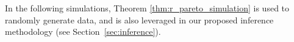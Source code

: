 \documentclass[12pt]{article}
\begin{document}
%
%
%
In the following simulations, Theorem \ref{thm:r_pareto_simulation} is used to randomly generate data, and is also leveraged in our proposed inference methodology (see Section~\ref{sec:inference}).

\end{document}
